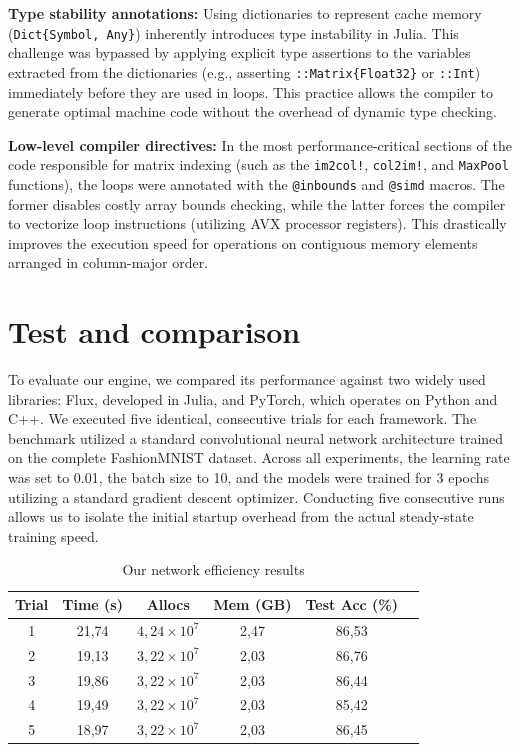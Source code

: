 \documentclass[conference]{IEEEtran}
\begin{document}
\textbf{Type stability annotations:} Using dictionaries to represent cache memory (\texttt{Dict\{Symbol, Any\}}) inherently introduces type instability in Julia. This challenge was bypassed by applying explicit type assertions to the variables extracted from the dictionaries (e.g., asserting \texttt{::Matrix\{Float32\}} or \texttt{::Int}) immediately before they are used in loops. This practice allows the compiler to generate optimal machine code without the overhead of dynamic type checking.

\textbf{Low-level compiler directives:} In the most performance-critical sections of the code responsible for matrix indexing (such as the \texttt{im2col!}, \texttt{col2im!}, and \texttt{MaxPool} functions), the loops were annotated with the \texttt{@inbounds} and \texttt{@simd} macros. The former disables costly array bounds checking, while the latter forces the compiler to vectorize loop instructions (utilizing AVX processor registers). This drastically improves the execution speed for operations on contiguous memory elements arranged in column-major order.

\section{Test and comparison}
To evaluate our engine, we compared its performance against two widely used libraries: Flux, developed in Julia, and PyTorch, which operates on Python and C++. We executed five identical, consecutive trials for each framework. The benchmark utilized a standard convolutional neural network architecture trained on the complete FashionMNIST dataset. Across all experiments, the learning rate was set to 0.01, the batch size to 10, and the models were trained for 3 epochs utilizing a standard gradient descent optimizer. Conducting five consecutive runs allows us to isolate the initial startup overhead from the actual steady-state training speed.

\begin{table}[htbp]
\centering
\caption{Our network efficiency results}
\label{tab:mynet_efficiency}
\begin{tabular}{|c|c|c|c|c|c|}
\hline
\textbf{Trial} & \textbf{Time (s)} & \textbf{Allocs} & \textbf{Mem (GB)} & \textbf{Test Acc (\%)} \\ \hline
1 & 21,74 & $4,24 \times 10^7$ & 2,47 & 86,53 \\ \hline
2 & 19,13 & $3,22 \times 10^7$ & 2,03 & 86,76 \\ \hline
3 & 19,86 & $3,22 \times 10^7$ & 2,03 & 86,44 \\ \hline
4 & 19,49 & $3,22 \times 10^7$ & 2,03 & 85,42 \\ \hline
5 & 18,97 & $3,22 \times 10^7$ & 2,03 & 86,45 \\ \hline
\end{tabular}
\end{table}
\end{document}
